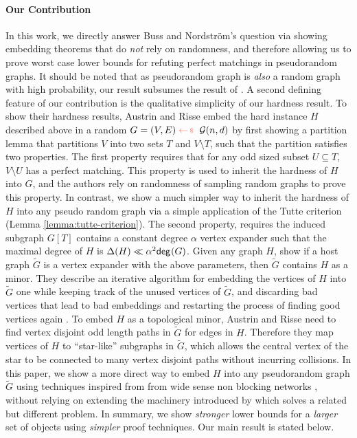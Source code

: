 \documentclass[11pt]{article}
\begin{document}
\paragraph{Our Contribution} In this work, we directly answer Buss and Nordstr{\"o}m's question via showing embedding theorems that do \emph{not} rely on randomness, and therefore allowing us to prove worst case lower bounds for refuting perfect matchings in pseudorandom graphs.
It should be noted that as pseudorandom graph is \emph{also} a random graph with high probability, our result subsumes the result of \citet{Austrin_2022}.
A second defining feature of our contribution is the qualitative simplicity of our hardness result.
To show their hardness results, Austrin and Risse embed the hard instance $H$ described above in a random $G=(V,E) \samples \mathcal{G}(n,d)$ by first showing a partition lemma that partitions $V$ into two sets $T$ and $V \setminus T$, such that the partition satisfies two properties.
The first property requires that for any odd sized subset $U \subseteq T$, $V \setminus U$ has a perfect matching.
This property is used to inherit the hardness of $H$ into $G$, and the authors rely on randomness of sampling random graphs to prove this property.
In contrast, we show a much simpler way to inherit the hardness of $H$ into any pseudo random graph via a simple application of the Tutte criterion (Lemma \ref{lemma:tutte-criterion}). 
The second property, requires the induced subgraph $G[T]$ contains a constant degree $\alpha$ vertex expander such that the maximal degree of $H$ is $\Delta(H) \ll \alpha^2 \mathsf{deg}_{}(G)$.
Given any graph $H$, \citet{krivelevich2019completeminorsgraphssparse} show if a host graph $\tilde{G}$ is a vertex expander with the above parameters, then $\tilde{G}$ contains $H$ as a minor.
They describe an iterative algorithm for  embedding the vertices of $H$ into $\tilde{G}$ one while keeping track of the unused vertices of $\tilde{G}$, and discarding bad vertices that lead to bad embeddings and restarting the process of finding good vertices again .
To embed $H$ as a topological minor, Austrin and Risse need to find vertex disjoint odd length paths in $\tilde{G}$ for edges in $H$.
Therefore they map vertices of $H$ to ``star-like'' subgraphs in $\tilde{G}$, which allows the central vertex of the star to be connected to many vertex disjoint paths without incurring collisions.
In this paper, we show a more direct way to embed $H$ into any pseudorandom graph $\tilde{G}$ using techniques inspired from from wide sense non blocking networks \citep{feldman1988wide}, without relying on extending the machinery introduced by \citet{krivelevich2019completeminorsgraphssparse} which solves a related but different problem.
In summary, we show \emph{stronger} lower bounds for a \emph{larger} set of objects using \emph{simpler} proof techniques.
Our main result is stated below.
\end{document}
